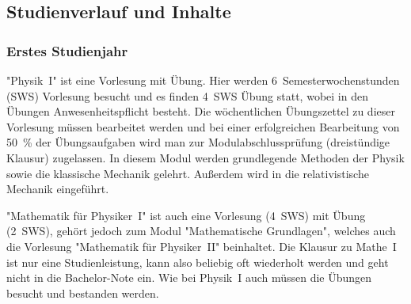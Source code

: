 \begin{multicols}{2}
\subsection{Studienverlauf und Inhalte}
\subsubsection{Erstes Studienjahr}
"Physik~I" ist eine Vorlesung mit Übung.
Hier werden 6~Semesterwochenstunden (SWS) Vorlesung besucht und es finden 4~SWS Übung statt, wobei in den Übungen Anwesenheitspflicht besteht.
Die wöchentlichen Übungszettel zu dieser Vorlesung müssen bearbeitet werden und bei einer erfolgreichen Bearbeitung von \SI{50}{\percent} der Übungsaufgaben wird man zur Modulabschlussprüfung (dreistündige Klausur) zugelassen.
In diesem Modul werden grundlegende Methoden der Physik sowie die klassische Mechanik gelehrt.
Außerdem wird in die relativistische Mechanik eingeführt.

"Mathematik für Physiker~I" ist auch eine Vorlesung (4~SWS) mit Übung (2~SWS), gehört jedoch zum Modul "Mathematische Grundlagen", welches auch die Vorlesung "Mathematik für Physiker~II" beinhaltet.
Die Klausur zu Mathe~I ist nur eine Studienleistung, kann also beliebig oft wiederholt werden und geht nicht in die Bachelor-Note ein.
Wie bei Physik~I auch müssen die Übungen besucht und bestanden werden.

\vspace{\fill}


\begin{table*}
\let\fibnl=\par
\setlength{\fibtemp}{0.195\textwidth}
\renewcommand{\multirowsetup}{\centering}


\end{table*}
\end{multicols}

